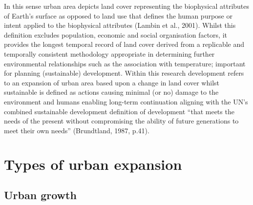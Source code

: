 \documentclass[]{book}
\begin{document}
In this sense urban area depicts land cover representing the biophysical
attributes of Earth's surface as opposed to land use that defines the
human purpose or intent applied to the biophysical attributes (Lambin et
al., 2001). Whilst this definition excludes population, economic and
social organisation factors, it provides the longest temporal record of
land cover derived from a replicable and temporally consistent
methodology appropriate in determining further environmental
relationships such as the association with temperature; important for
planning (sustainable) development. Within this research development
refers to an expansion of urban area based upon a change in land cover
whilst sustainable is defined as actions causing minimal (or no) damage
to the environment and humans enabling long-term continuation aligning
with the UN's combined sustainable development definition of development
``that meets the needs of the present without compromising the ability
of future generations to meet their own needs'' (Brundtland, 1987,
p.41).

\section{Types of urban expansion}\label{types-of-urban-expansion}

\subsection{Urban growth}\label{urban-growth}
\end{document}
